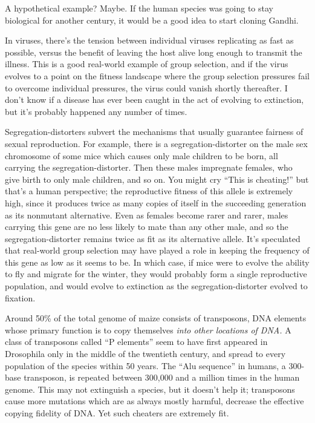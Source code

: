 {
 A hypothetical example? Maybe. If the human species was going to
stay biological for another century, it would be a good idea to start
cloning Gandhi.}

{
 In viruses, there's the tension between individual
viruses replicating as fast as possible, versus the benefit of leaving
the host alive long enough to transmit the illness. This is a good
real-world example of group selection, and if the virus evolves to a
point on the fitness landscape where the group selection pressures fail
to overcome individual pressures, the virus could vanish shortly
thereafter. I don't know if a disease has ever been
caught in the act of evolving to extinction, but it's
probably happened any number of times.}

{
 Segregation-distorters subvert the mechanisms that usually
guarantee fairness of sexual reproduction. For example, there is a
segregation-distorter on the male sex chromosome of some mice which
causes only male children to be born, all carrying the
segregation-distorter. Then these males impregnate females, who give
birth to only male children, and so on. You might cry
``This is cheating!'' but
that's a human perspective; the reproductive fitness of
this allele is extremely high, since it produces twice as many copies
of itself in the succeeding generation as its nonmutant alternative.
Even as females become rarer and rarer, males carrying this gene are no
less likely to mate than any other male, and so the
segregation-distorter remains twice as fit as its alternative allele.
It's speculated that real-world group selection may
have played a role in keeping the frequency of this gene as low as it
seems to be. In which case, if mice were to evolve the ability to fly
and migrate for the winter, they would probably form a single
reproductive population, and would evolve to extinction as the
segregation-distorter evolved to fixation.}

{
 Around 50\% of the total genome of maize consists of transposons,
DNA elements whose primary function is to copy themselves \textit{into
other locations of DNA.} A class of transposons called
``P elements'' seem to have first
appeared in Drosophila only in the middle of the twentieth century, and
spread to every population of the species within 50 years. The
``Alu sequence'' in humans, a
300-base transposon, is repeated between 300,000 and a million times in
the human genome. This may not extinguish a species, but it
doesn't help it; transposons cause more mutations which
are as always mostly harmful, decrease the effective copying fidelity
of DNA. Yet such cheaters are extremely fit.}

